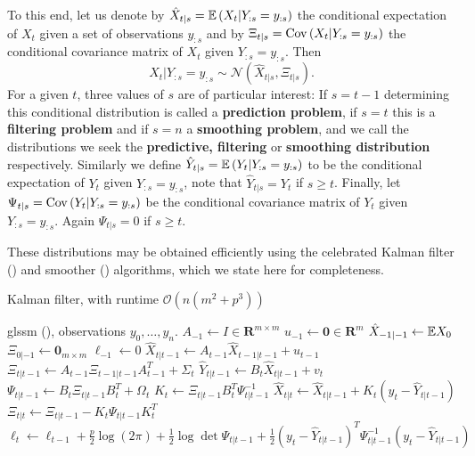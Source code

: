 To this end, let us denote by $\hat X_{t | s} = \mathbb E \left( X_{t} | Y_{:s} = y_{:s}\right)$ the conditional expectation of $X_{t}$ given a set of observations $y_{:s}$ and by $\Xi_{t | s} = \operatorname{Cov} \left( X_{t} | Y_{:s} = y_{:s} \right)$ the conditional covariance matrix of $X_{t}$ given $Y_{:s} = y_{:s}$. Then $$X_{t} | Y_{:s} = y_{:s} \sim \mathcal N \left( \hat X_{t|s}, \Xi_{t|s} \right).$$ For a given $t$, three values of $s$ are of particular interest: If $s = t - 1$ determining this conditional distribution is called a \textbf{prediction problem}, if $s = t$ this is a \textbf{filtering problem} and if $s = n$ a \textbf{smoothing problem}, and we call the distributions we seek the \textbf{predictive, filtering} or \textbf{smoothing distribution} respectively. 
Similarly we define $\hat Y_{t|s} = \mathbb E \left( Y_{t} \middle| Y_{:s} = y_{:s} \right)$ to be the conditional expectation of $Y_{t}$ given $Y_{:s}=y_{:s}$, note that $\hat Y_{t|s} = Y_{t}$ if $s \geq t$. Finally, let $\Psi_{t|s} = \operatorname{Cov} \left( Y_{t} | Y_{:s} = y_{:s} \right)$ be the conditional covariance matrix of $Y_{t}$ given $Y_{:s} = y_{:s}$. Again $\Psi_{t|s} = 0$ if $s \geq t$. 

These distributions may be obtained efficiently using the celebrated Kalman filter () and smoother () algorithms, which we state here for completeness.

\begin{algorithm}
    \caption{Kalman filter, with runtime $\mathcal O(n(m^{2} + p^{3}))$}
    \label{alg:kalman_filter}
    \begin{algorithmic}[1]
        \Require \gls{glssm} (), observations $y_{0}, \dots, y_{n}$.
        \State $A_{-1} \gets I \in \mathbf R^{m\times m}$ 
        \State $u_{-1} \gets \mathbf 0 \in \mathbf R^{m}$ 
        \State $\hat X_{-1|-1} \gets \mathbb E X_0$
        \State $\Xi_{0|-1} \gets \mathbf 0_{m\times m}$
        \State $\ell_{-1} \gets 0$
            \State\label{step:kf_loop}$\hat X_{t| t - 1} \gets A_{t-1} \hat X_{t-1|t-1} + u_{t-1}$ 
            \State $\Xi_{t | t - 1} \gets A_{t - 1} \Xi_{t - 1 | t - 1 } A_{t - 1}^{T} + \Sigma_{t}$ 
            \State $\hat Y_{t|t - 1} \gets B_{t}\hat X_{t | t - 1} + v_{t}$
            \State $\Psi_{t|t - 1} \gets B_{t}\Xi_{t | t - 1} B_{t}^T + \Omega_{t}$
            \State $K_t \gets \Xi_{t | t - 1} B_{t}^T \Psi_{t | t - 1} ^{-1}$ 
            \State $\hat X_{t | t} \gets \hat X_{t | t - 1} + K_t (y_{t} - \hat Y_{t | t - 1})$
            \State $\Xi_{t| t } \gets \Xi_{t | t - 1} - K_t \Psi_{t| t - 1} K_t^T$
            \State $\ell_{t} \gets \ell_{t - 1} + \frac{p}{2} \log (2\pi) + \frac{1}{2}\log\det \Psi_{t|t -1} + \frac{1}{2} \left( y_{t} - \hat Y_{t | t - 1} \right)^{T} \Psi_{t|t-1}^{-1} \left( y_{t} - \hat Y_{t | t - 1} \right) $ 
        \EndFor
    \end{algorithmic}
\end{algorithm}

